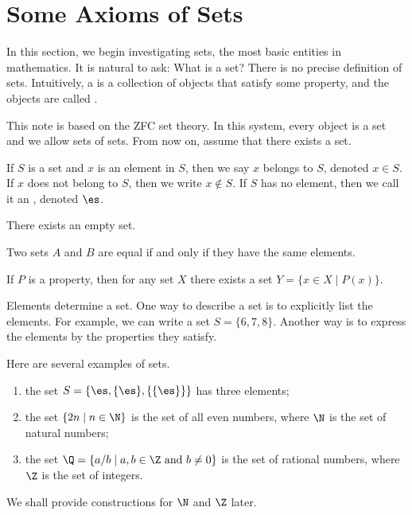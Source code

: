 \documentclass[10pt]{article}
\begin{document}
\section{Some Axioms of Sets}
\par
In this section, we begin investigating sets, the most basic entities in mathematics. It is natural to ask: What is a set? There is no precise definition of sets. Intuitively, a  is a collection of objects that satisfy some property, and the objects are called .
\begin{remark}
    This note is based on the ZFC set theory. In this system, every object is a set and we allow sets of sets. From now on, assume that there exists a set.
\end{remark}
\par
If $S$ is a set and $x$ is an element in $S$, then we say $x$ belongs to $S$, denoted $x\in S$. If $x$ does not belong to $S$, then we write $x\notin S$. If $S$ has no element, then we call it an , denoted $\es$.
\begin{Axiom of empty set}
    There exists an empty set.
\end{Axiom of empty set}
\begin{Axiom of extensionality}
    Two sets $A$ and $B$ are equal if and only if they have the same elements.
\end{Axiom of extensionality}
\begin{Axiom schema of separation}
    If $P$ is a property, then for any set $X$ there exists a set $Y=\{x\in X\mid P(x)\}$.
\end{Axiom schema of separation}
\par
Elements determine a set. One way to describe a set is to explicitly list the elements. For example, we can write a set $S=\{6,7,8\}$. Another way is to express the elements by the properties they satisfy.
\begin{example}
    Here are several examples of sets.
    \begin{enumerate}
        \item the set $S=\{\es,\{\es\},\{\{\es\}\}\}$ has three elements;
        \item the set $\{2n\mid n\in\N\}$ is the set of all even numbers, where $\N$ is the set of natural numbers;
        \item the set $\Q=\{a/b\mid a,b\in\Z\ \text{and}\ b\ne 0\}$ is the set of rational numbers, where $\Z$ is the set of integers.
    \end{enumerate}
    We shall provide constructions for $\N$ and $\Z$ later.
\end{example}
\end{document}
